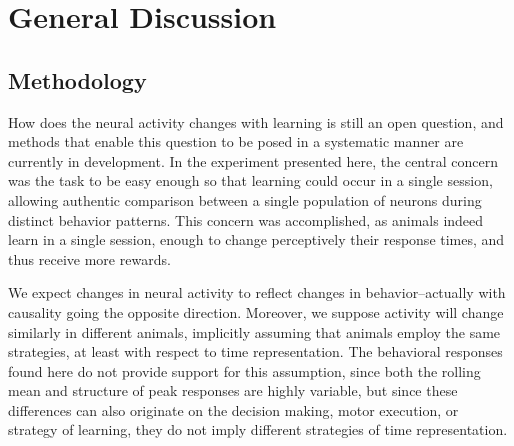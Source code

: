 


\chapter{General Discussion}
\label{chap:results}

\section{Methodology}
    How does the neural activity changes with learning is still an open question, and methods that enable this question to be posed in a systematic manner are currently in development. In the experiment presented here, the central concern was the task to be easy enough so that learning could occur in a single session, allowing authentic comparison between a single population of neurons during distinct behavior patterns. This concern was accomplished, as animals indeed learn in a single session, enough to change perceptively their response times, and thus receive more rewards. 
    
    We expect changes in neural activity to reflect changes in behavior--actually with causality going the opposite direction. Moreover, we suppose activity will change similarly in different animals, implicitly assuming that animals employ the same strategies, at least with respect to time representation. The behavioral responses found here do not provide support for this assumption, since both the rolling mean and structure of peak responses are highly variable, but since these differences can also originate on the decision making, motor execution, or strategy of learning, they do not imply different strategies of time representation.
    
